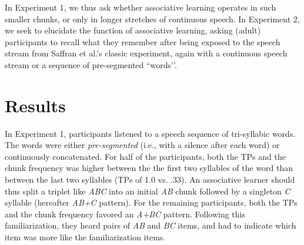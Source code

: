\documentclass[]{article}
\begin{document}
In Experiment 1, we thus ask whether associative learning operates in such smaller chunks, or only in longer stretches of continuous speech. In Experiment 2, we seek to elucidate the function of associative learning, asking (adult) participants to recall what they remember after being exposed to the speech stream from Saffran et al.'s \citep{Saffran-Science} classic experiment, again with a continuous speech stream or a sequence of pre-segmented ``words’’.

\clearpage

\section{Results}\label{results}


In Experiment 1, participants listened to a speech sequence of tri-syllabic words. The words were either \emph{pre-segmented} (i.e., with a silence after each word) or continuously concatenated. For half of the participants, both the TPs and the chunk frequency was higher between the the first two syllables of the word than between the last two syllables (TPs of 1.0 vs. .33). An associative learner should thus split a triplet like \emph{ABC} into an initial \emph{AB} chunk followed by a singleton \emph{C} syllable (hereafter \emph{AB+C} pattern). For the remaining participants, both the TPs and the chunk frequency favored an \emph{A+BC} pattern. Following this familiarization, they heard pairs of \emph{AB} and \emph{BC} items, and had to indicate which item was more like the familiarization items.

\end{document}
